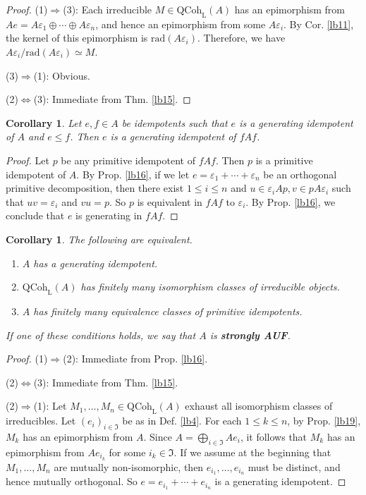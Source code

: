 \documentclass[11pt,b5paper,notitlepage]{article}
\theoremstyle{definition}
\theoremstyle{plain}
\newtheorem{co}[df]{Corollary}
\newcommand{\fk}{\mathfrak}
\newcommand{\eps}{\varepsilon}
\newcommand{\QC}{\mathrm{QCoh}_{\mathrm L}}
\newcommand{\rad}{\mathrm{rad}}
\numberwithin{equation}{section}
\begin{document}
\begin{proof}
(1)$\Rightarrow$(3): Each irreducible $M\in\QC(A)$ has an epimorphism from $Ae=A\eps_1\oplus\cdots\oplus A\eps_n$, and hence an epimorphism from some $A\eps_i$. By Cor. \ref{lb11}, the kernel of this epimorphism is $\rad(A\eps_i)$. Therefore, we have $A\eps_i/\rad(A\eps_i)\simeq M$. 

(3)$\Rightarrow$(1): Obvious.

(2)$\Leftrightarrow$(3): Immediate from Thm. \ref{lb15}.
\end{proof}


\begin{co}\label{lb59}
Let $e,f\in A$ be idempotents such that $e$ is a generating idempotent of $A$ and $e\leq f$. Then $e$ is a generating idempotent of $fAf$.
\end{co}


\begin{proof}
Let $p$ be any primitive idempotent of $fAf$. Then $p$ is a primitive idempotent of $A$. By Prop. \ref{lb16}, if we let $e=\eps_1+\cdots+\eps_n$ be an orthogonal primitive decomposition, then there exist $1\leq i\leq n$ and $u\in \eps_i A p,v\in pA\eps_i$ such that $uv=\eps_i$ and $vu=p$. So $p$ is equivalent in $fAf$ to $\eps_i$. By Prop. \ref{lb16}, we conclude that $e$ is generating in $fAf$.
\end{proof}




\begin{co}\label{lb33}
The following are equivalent.
\begin{enumerate}[label=(\arabic*)]
\item $A$ has a generating idempotent.
\item $\QC(A)$ has finitely many isomorphism classes of irreducible objects.
\item $A$ has finitely many equivalence classes of primitive idempotents.
\end{enumerate}
If one of these conditions holds, we say that $A$ is \textbf{strongly AUF}.
\end{co}


\begin{proof}
(1)$\Rightarrow$(2): Immediate from Prop. \ref{lb16}.

(2)$\Leftrightarrow$(3): Immediate from Thm. \ref{lb15}.

(2)$\Rightarrow$(1): Let $M_1,\dots,M_n\in\QC(A)$ exhaust all isomorphism classes of irreducibles. Let $(e_i)_{i\in\fk I}$ be as in Def. \ref{lb4}. For each $1\leq k\leq n$, by Prop. \ref{lb19}, $M_k$ has an epimorphism from $A$. Since $A=\bigoplus_{i\in\fk I}Ae_i$, it follows that $M_k$ has an epimorphism from $Ae_{i_k}$ for some $i_k\in\fk I$. If we assume at the beginning that $M_1,\dots,M_n$ are mutually non-isomorphic, then $e_{i_1},\dots,e_{i_n}$ must be distinct, and hence mutually orthogonal. So $e=e_{i_1}+\cdots+e_{i_n}$ is a generating idempotent.
\end{proof}
\end{document}
